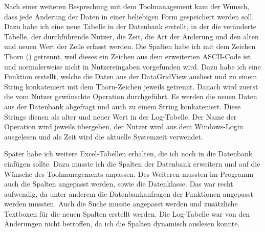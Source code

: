 \documentclass{Vorlage}
\begin{document}
Nach einer weiteren Besprechung mit dem Toolmanagement kam der Wunsch, dass jede Änderung der Daten in einer
beliebigen Form gespeichert werden soll. Dazu habe ich eine neue Tabelle in der Datenbank erstellt, in der 
die veränderte Tabelle, der durchführende Nutzer, die Zeit, die Art der Änderung und den alten und neuen
Wert der Zeile erfasst werden. Die Spalten habe ich mit dem Zeichen Thorn (\th) getrennt, weil dieses 
ein Zeichen aus dem erweiterten ASCII-Code ist und normalerweise nicht in Nutzereingaben vorgefunden wird.
Dazu habe ich eine Funktion erstellt, welche die Daten aus der DataGridView ausliest und zu einem String
konkateniert mit dem Thorn-Zeichen jeweils getrennt. Danach wird zuerst die vom Nutzer gewünschte Operation
durchgeführt. Es werden die neuen Daten aus der Datenbank abgefragt und auch zu einem String konkateniert.
Diese Strings dienen als alter und neuer Wert in der Log-Tabelle. Der Name der Operation wird jeweils
übergeben, der Nutzer wird aus dem Windows-Login ausgelesen und als Zeit wird die aktuelle Systemzeit 
verwendet.

Später habe ich weitere Excel-Tabellen erhalten, die ich noch in die Datenbank einfügen sollte. Dazu musste ich
die Spalten der Datenbank erweitern und auf die Wünsche des Toolmanagements anpassen. Des Weiteren mussten
im Programm auch die Spalten angepasst werden, sowie die Datenklasse. Das war recht aufwendig, da unter 
anderem die Datenbankanfragen der Funktionen angepasst werden mussten. Auch die Suche musste angepasst werden
und zusätzliche Textboxen für die neuen Spalten erstellt werden. Die Log-Tabelle war von den Änderungen
nicht betroffen, da ich die Spalten dynamisch auslesen konnte.
\end{document}
